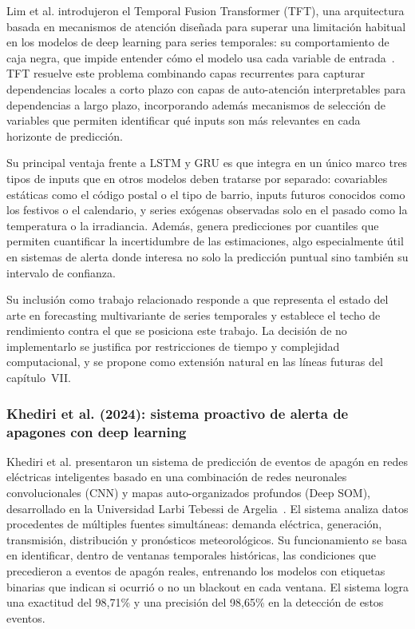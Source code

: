 \documentclass[12pt, a4paper]{article}
\begin{document}
Lim et al. introdujeron el Temporal Fusion Transformer (TFT), una arquitectura basada en mecanismos de atención diseñada para superar una limitación habitual en los modelos de deep learning para series temporales: su comportamiento de caja negra, que impide entender cómo el modelo usa cada variable de entrada~\cite{lim2021}. TFT resuelve este problema combinando capas recurrentes para capturar dependencias locales a corto plazo con capas de auto-atención interpretables para dependencias a largo plazo, incorporando además mecanismos de selección de variables que permiten identificar qué inputs son más relevantes en cada horizonte de predicción.

Su principal ventaja frente a LSTM y GRU es que integra en un único marco tres tipos de inputs que en otros modelos deben tratarse por separado: covariables estáticas como el código postal o el tipo de barrio, inputs futuros conocidos como los festivos o el calendario, y series exógenas observadas solo en el pasado como la temperatura o la irradiancia. Además, genera predicciones por cuantiles que permiten cuantificar la incertidumbre de las estimaciones, algo especialmente útil en sistemas de alerta donde interesa no solo la predicción puntual sino también su intervalo de confianza.

Su inclusión como trabajo relacionado responde a que representa el estado del arte en forecasting multivariante de series temporales y establece el techo de rendimiento contra el que se posiciona este trabajo. La decisión de no implementarlo se justifica por restricciones de tiempo y complejidad computacional, y se propone como extensión natural en las líneas futuras del capítulo~VII.

\subsubsection{Khediri et al. (2024): sistema proactivo de alerta de apagones con deep learning}

Khediri et al. presentaron un sistema de predicción de eventos de apagón en redes eléctricas inteligentes basado en una combinación de redes neuronales convolucionales (CNN) y mapas auto-organizados profundos (Deep SOM), desarrollado en la Universidad Larbi Tebessi de Argelia~\cite{khediri2024}. El sistema analiza datos procedentes de múltiples fuentes simultáneas: demanda eléctrica, generación, transmisión, distribución y pronósticos meteorológicos. Su funcionamiento se basa en identificar, dentro de ventanas temporales históricas, las condiciones que precedieron a eventos de apagón reales, entrenando los modelos con etiquetas binarias que indican si ocurrió o no un blackout en cada ventana. El sistema logra una exactitud del 98,71\% y una precisión del 98,65\% en la detección de estos eventos.
\end{document}
